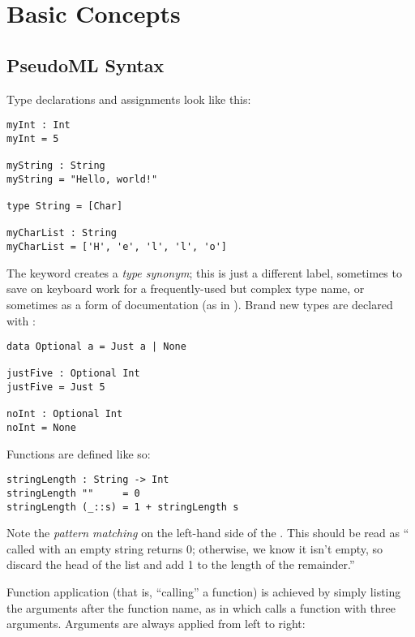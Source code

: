 
\chapter{Basic Concepts}

\section{PseudoML Syntax}\label{sec:pseudoml}

Type declarations and assignments look like this: 

\begin{lstlisting}[language=pseudoml]
myInt : Int
myInt = 5

myString : String
myString = "Hello, world!"

type String = [Char]

myCharList : String
myCharList = ['H', 'e', 'l', 'l', 'o']
\end{lstlisting}

The  keyword creates a \emph{type synonym}; this is just a different label, sometimes to save on keyboard work for a frequently-used but complex type name, or sometimes as a form of documentation (as in ). Brand new types are declared with :

\begin{lstlisting}[language=pseudoml]
data Optional a = Just a | None

justFive : Optional Int
justFive = Just 5

noInt : Optional Int
noInt = None
\end{lstlisting}

Functions are defined like so:

\begin{lstlisting}[language=pseudoml]
stringLength : String -> Int
stringLength ""     = 0
stringLength (_::s) = 1 + stringLength s
\end{lstlisting}

Note the \emph{pattern matching} on the left-hand side of the \mlil{=}. This should be read as `` called with an empty string returns 0; otherwise, we know it isn't empty, so discard the head of the list and add 1 to the length of the remainder.''

Function application (that is, ``calling'' a function) is achieved by simply listing the arguments after the function name, as in  which calls a function  with three arguments. Arguments are always applied from left to right:

